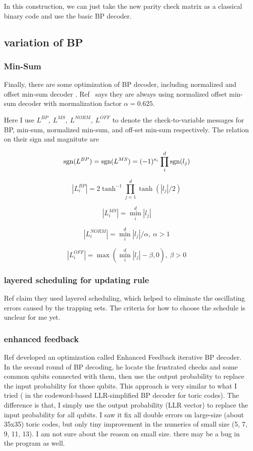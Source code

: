 \documentclass[aps,prb,12pt,tightenlines,%
notitlepage,longbibliography
]{revtex4-1}
\begin{document}
In this construction, we can just take the new parity check matrix as
a classical binary code and use the basic BP decoder.


\subsection{variation of BP}
\subsubsection{Min-Sum}
Finally, there are some optimization of BP decoder, including
normalized and offset min-sum
decoder \cite{chen2005improved}. Ref~\cite{panteleev2019degenerate} says they are always using
normalized offset min-sum decoder with mormalization factor $\alpha=0.625$.

Here I use $L^{BP},~L^{MS},~L^{NORM},~L^{OFF}$ to denote the
check-to-variable messages
for BP, min-sum,
normalized min-sum, and off-set min-sum respectively. The relation on
their sign and magnitute are

$$\mathop{\rm sgn}(L^{BP})=\mathop{\rm sgn}(L^{MS})=(-1)^{s_c}\prod_i^d \mathop{\rm sgn}(l_j)$$

$$|L_i^{BP}| =  2 \tanh^{-1} \prod_{j=1}^d \tanh (|l_j|/2)$$

$$|L_i^{MS}| = \min_i^d |l_j|$$

$$|L_i^{NORM}| = \min_i^d |l_j|/\alpha,~\alpha>1$$

$$|L_i^{OFF}| = \max( \min_i^d |l_j| - \beta, 0),~\beta >0$$


\subsubsection{layered scheduling for updating rule}
Ref \cite{panteleev2019degenerate} claim they used layered scheduling,
which helped to eliminate the oscillating errors caused by the
trapping sets.
The criteria for how to choose the schedule is unclear for me yet.


\subsubsection{enhanced feedback}
Ref \cite{wang2012enhanced} developed an optimization called Enhanced
Feedback iterative BP decoder. In the second round of BP decoding, he
locate the frustrated checks and some common qubits connected with
them, then use the output probability to replace the input probability
for those qubits. This approach is very similar to what I tried ( in
the codeword-based LLR-simplified BP decoder for toric codes). The
difference is that, I simply use the output probability (LLR vector)
to replace the input probability for all qubits. I saw it fix all double errors
on large-size (about 35x35) toric codes, but only tiny improvement in
the numerics of small size (5, 7, 9, 11, 13).  I am not sure about the
reason on small size. there may be a bug in the program as well.
\end{document}
